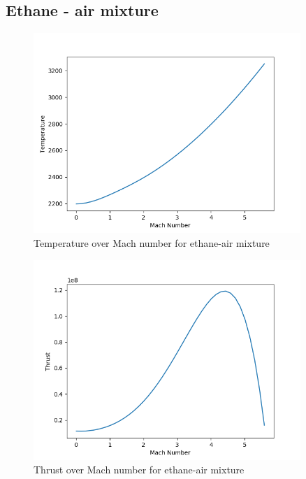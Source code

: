 \documentclass[a4paper,11pt]{article}
\begin{document}
\subsection{Ethane - air mixture}
	\begin{figure}[H]
		\centering
       		\includegraphics[width=0.9\textwidth]{etan_pow(1mol)/Temperature_over_Mach.png}
       		\caption{Temperature over Mach number for ethane-air mixture}
	\end{figure}
	\begin{figure}[H]
		\centering
		\includegraphics[width=0.9\textwidth]{etan_pow(1mol)/Thrust_over_Mach.png}
       		\caption{Thrust over Mach number for ethane-air mixture}
	\end{figure}
\end{document}
